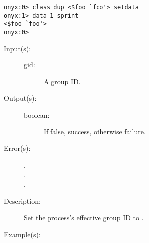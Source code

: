\begin{description}
\begin{description}
\begin{verbatim}
onyx:0> class dup <$foo `foo'> setdata
onyx:1> data 1 sprint
<$foo `foo'>
onyx:0>
		\end{verbatim}
	\end{description}
\label{systemdict:setegid}
\item[{\onyxop{gid}{setegid}{boolean}}: ]
	\begin{description}\item[]
	\item[Input(s): ]
		\begin{description}\item[]
		\item[gid: ]
			A group ID.
		\end{description}
	\item[Output(s): ]
		\begin{description}\item[]
		\item[boolean: ]
			If false, success, otherwise failure.
		\end{description}
	\item[Error(s): ]
		\begin{description}\item[]
		\item[.]
		\item[.]
		\item[.]
		\end{description}
	\item[Description: ]
		Set the process's effective group ID to .
	\item[Example(s): ]\begin{verbatim}


\end{verbatim}
\end{description}
\end{description}
